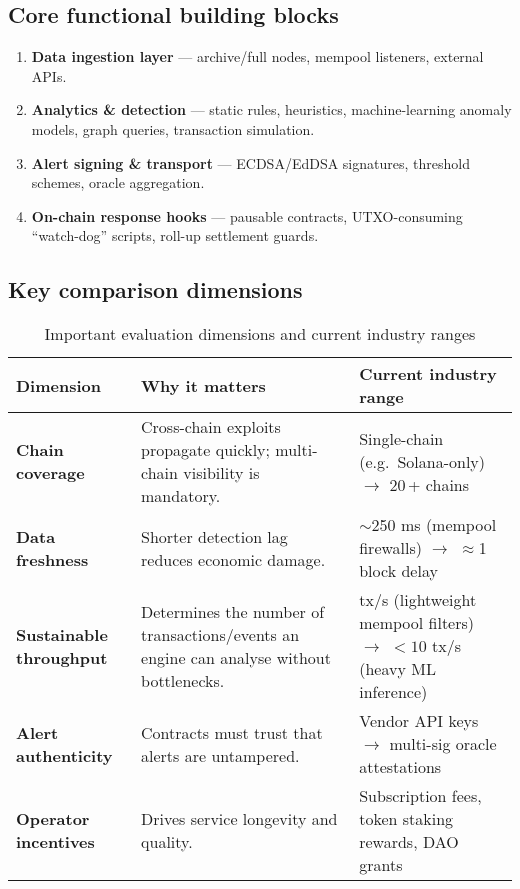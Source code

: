 \documentclass{scrreport}
\begin{document}
\subsection{Core functional building blocks}
\begin{enumerate}
  \item \textbf{Data ingestion layer} — archive/full nodes, mempool listeners, external APIs.
  \item \textbf{Analytics \& detection} — static rules, heuristics, machine-learning anomaly models,
        graph queries, transaction simulation.
  \item \textbf{Alert signing \& transport} — ECDSA/EdDSA signatures, threshold schemes,
        oracle aggregation.
  \item \textbf{On-chain response hooks} — pausable contracts, UTXO-consuming ``watch-dog'' scripts,
        roll-up settlement guards.
\end{enumerate}

\subsection{Key comparison dimensions}

\begin{table}[H]
\centering
\caption{Important evaluation dimensions and current industry ranges}
\begin{tabularx}{\textwidth}{>{\raggedright\arraybackslash}p{3.3cm}%
                          >{\raggedright\arraybackslash}X
                          >{\raggedright\arraybackslash}p{5.2cm}}
\toprule
Dimension & Why it matters & Current industry range \\ \midrule
\textbf{Chain coverage} & Cross-chain exploits propagate quickly; multi-chain visibility is mandatory. &
  Single-chain (e.g.\ Solana-only) $\rightarrow$ 20\,+ chains \\ \addlinespace[0.3em]

\textbf{Data freshness} & Shorter detection lag reduces economic damage. &
  $\sim$250 ms (mempool firewalls) $\rightarrow$ $\approx$1 block delay \\ \addlinespace[0.3em]

\textbf{Sustainable throughput} & Determines the number of transactions/events an engine can analyse
without bottlenecks. &
  800 tx/s (lightweight mempool filters) $\rightarrow$ $<10$ tx/s (heavy ML inference) \\ \addlinespace[0.3em]

\textbf{Alert authenticity} & Contracts must trust that alerts are untampered. &
  Vendor API keys $\rightarrow$ multi-sig oracle attestations \\ \addlinespace[0.3em]

\textbf{Operator incentives} & Drives service longevity and quality. &
  Subscription fees, token staking rewards, DAO grants \\ \bottomrule
\end{tabularx}
\end{table}
\end{document}
